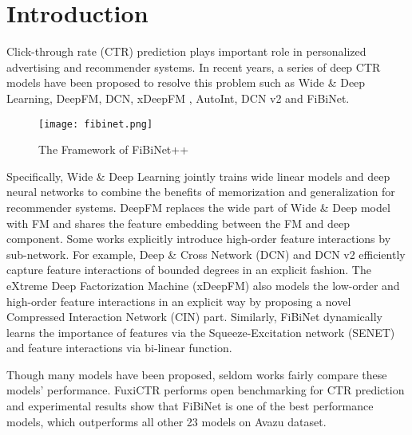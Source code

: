 \documentclass[sigconf]{acmart}
\begin{document}





\maketitle

\section{Introduction}

Click-through rate (CTR) prediction plays important role in personalized advertising and recommender systems\cite{web1,graepel2010web,he2014practical,koren2009matrix,deeplight}. In recent years, a series of deep CTR models have been proposed to resolve this problem such as 
Wide \& Deep Learning\cite{cheng2016wide}, DeepFM\cite{guo2017deepfm}, DCN\cite{wang2017deep}, xDeepFM \cite{lian2018xdeepfm}, AutoInt\cite{song2019autoint}, DCN v2\cite{WangSCJLHC21} and FiBiNet\cite{HuangZZ19}. 
\begin{figure}[h]
  \centering
  \texttt{[image: fibinet.png]}
  \caption{The Framework of FiBiNet++}
\end{figure}
Specifically, Wide \& Deep Learning\cite{cheng2016wide} jointly trains wide linear models and deep neural networks to combine the benefits of memorization and generalization for recommender systems. DeepFM\cite{guo2017deepfm} replaces the wide part of Wide \& Deep model with FM and shares the feature embedding between the FM and deep component. Some works explicitly introduce high-order feature interactions by sub-network. For example, Deep \& Cross Network (DCN)\cite{wang2017deep} and DCN v2\cite{WangSCJLHC21} efficiently capture feature interactions of bounded degrees in an explicit fashion. The eXtreme Deep Factorization Machine (xDeepFM) \cite{lian2018xdeepfm} also models the low-order and high-order feature interactions in an explicit way by proposing a novel Compressed Interaction Network (CIN) part. Similarly, 
FiBiNet\cite{HuangZZ19} dynamically learns the importance of features via the Squeeze-Excitation network (SENET) and feature interactions via bi-linear function.


Though many models have been proposed, seldom works fairly compare these models' performance. FuxiCTR\cite{jieming-2009-05794} performs open benchmarking for CTR prediction and experimental results\cite{jieming-2009-05794} show that FiBiNet is one of the best performance models, which outperforms all other 23 models on Avazu dataset.
\end{document}
